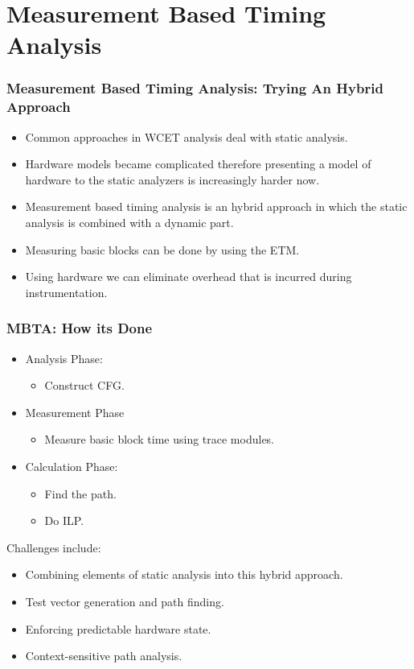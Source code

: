 \documentclass{beamer}
\begin{document}
\section{Measurement Based Timing Analysis}
\begin{frame}
    \frametitle{Measurement Based Timing Analysis: Trying An Hybrid Approach}
    \begin{itemize}
        \item Common approaches in WCET analysis deal with static analysis.
        \item Hardware models became complicated therefore presenting a model
            of hardware to the static analyzers is increasingly harder now.
        \item Measurement based timing analysis is an hybrid approach in which
            the static analysis is combined with a dynamic part.
        \item Measuring basic blocks can be done by using the ETM.
        \item Using hardware we can eliminate overhead that is incurred during
            instrumentation.
    \end{itemize}
\end{frame}
\begin{frame}
    \frametitle{MBTA: How its Done}
    \begin{itemize}
        \item Analysis Phase:
            \begin{itemize}
                \item Construct CFG.
            \end{itemize}
        \item Measurement Phase
            \begin{itemize}
                \item Measure basic block time using trace modules.
            \end{itemize}
        \item Calculation Phase:
            \begin{itemize}
                \item Find the path.
                \item Do ILP.
            \end{itemize}
    \end{itemize}
    Challenges include:
    \begin{itemize}
        \item Combining elements of static analysis into this hybrid approach.
        \item Test vector generation and path finding.
        \item Enforcing predictable hardware state.
        \item Context-sensitive path analysis.
    \end{itemize}
\end{frame}
\end{document}
